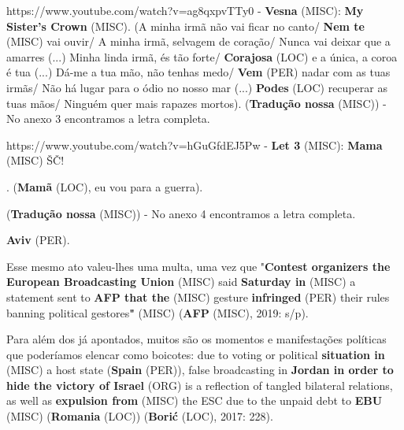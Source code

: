 \documentclass[12pt,a4paper]{article}
\begin{document}
https://www.youtube.com/watch?v=ag8qxpvTTy0 - \textbf{Vesna} (MISC): \textbf{My Sister's Crown} (MISC). (A minha irmã não vai ficar no canto/ \textbf{Nem te} (MISC) vai ouvir/ A minha irmã, selvagem de coração/ Nunca vai deixar que a amarres (...) Minha linda irmã, és tão forte/ \textbf{Corajosa} (LOC) e a única, a coroa é tua (...) Dá-me a tua mão, não tenhas medo/ \textbf{Vem} (PER) nadar com as tuas irmãs/ Não há lugar para o ódio no nosso mar (...) \textbf{Podes} (LOC) recuperar as tuas mãos/ Ninguém quer mais rapazes mortos). (\textbf{Tradução nossa} (MISC)) - No anexo 3 encontramos a letra completa.

https://www.youtube.com/watch?v=hGuGfdEJ5Pw - \textbf{Let 3} (MISC): \textbf{Mama} (MISC) ŠČ!

. (\textbf{Mamã} (LOC), eu vou para a guerra).

(\textbf{Tradução nossa} (MISC)) - No anexo 4 encontramos a letra completa.

\textbf{Aviv} (PER).

Esse  mesmo  ato  valeu-lhes  uma  multa,  uma  vez  que  "\textbf{Contest  organizers  the European Broadcasting Union} (MISC) said \textbf{Saturday in} (MISC) a statement sent to \textbf{AFP that the} (MISC) gesture \textbf{infringed} (PER) their rules banning political gestores\textbf{"} (MISC) (\textbf{AFP} (MISC), 2019: s/p).

Para além dos já apontados, muitos são os momentos  e manifestações políticas que poderíamos elencar como boicotes: due to voting or political \textbf{situation in} (MISC) a host state (\textbf{Spain} (PER)), false broadcasting in \textbf{Jordan in order to hide the victory of Israel} (ORG) is a reflection of tangled bilateral relations, as well as \textbf{expulsion from} (MISC) the ESC due to the unpaid debt to \textbf{EBU} (MISC) (\textbf{Romania} (LOC)) (\textbf{Borić} (LOC), 2017: 228).
\end{document}
